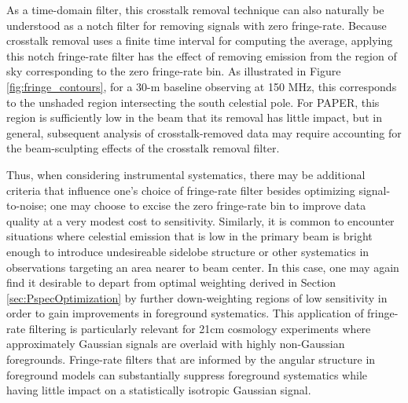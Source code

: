 \documentclass[twocolumn,apj,numberedappendix]{emulateapj}
\begin{document}
As a time-domain filter, this crosstalk removal technique can also naturally be understood as a notch filter
for removing signals with zero fringe-rate.  Because crosstalk removal uses a finite time interval for computing
the average, applying this notch fringe-rate filter has the effect of removing emission from the region of
sky corresponding to the zero fringe-rate bin.  As illustrated in Figure \ref{fig:fringe_contours}, for
a 30-m baseline observing at 150 MHz, this corresponds to the unshaded region intersecting the south celestial pole.
For PAPER, this region is sufficiently low in the beam that its removal has little impact, but in general, 
subsequent analysis of crosstalk-removed data may require accounting for the beam-sculpting effects of
the crosstalk removal filter.

Thus, when considering instrumental systematics, there may be additional criteria that influence one's
choice of fringe-rate filter besides optimizing signal-to-noise; one may choose to excise the zero fringe-rate
bin to improve data quality at a very modest cost to sensitivity.  Similarly, it is common to encounter situations
where celestial emission that is low in the primary beam is bright enough to introduce undesireable 
sidelobe structure or other systematics in observations targeting an area nearer to beam center.  In this case,
one may again find it desirable to depart from optimal weighting derived in Section \ref{sec:PspecOptimization}
by further down-weighting regions of low sensitivity in order to gain improvements in foreground systematics.
This application of fringe-rate filtering is particularly relevant for 21cm cosmology experiments where approximately
Gaussian signals are overlaid with highly non-Gaussian foregrounds.  Fringe-rate filters that are informed by 
the angular structure in foreground models can substantially suppress foreground systematics while having little
impact on a statistically isotropic Gaussian signal.


\end{document}
